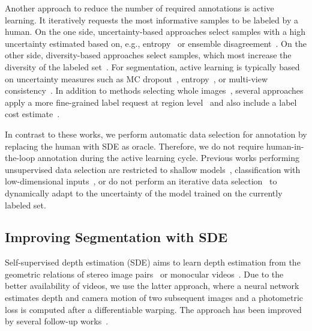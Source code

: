 \documentclass[final]{cvpr}
\begin{document}
Another approach to reduce the number of required annotations is active learning. It iteratively requests the most informative samples to be labeled by a human. 
On the one side, uncertainty-based approaches select samples with a high uncertainty estimated based on, e.g., entropy~\cite{hwa2004sample, settles2008analysis} or ensemble disagreement~\cite{seung1992query, mccallumzy1998employing}. 
On the other side, diversity-based approaches select samples, which most increase the diversity of the labeled set~\cite{nguyen2004active, sener2017active, sinha2019variational}.
For segmentation, active learning is typically based on uncertainty measures such as MC dropout~\cite{gal2016dropout, yang2017suggestive, mackowiak2018cereals},
entropy~\cite{kasarla2019region, xie2020deal}, or multi-view consistency~\cite{siddiqui2020viewal}. In addition to methods selecting whole images~\cite{gorriz2017cost, yang2017suggestive, xie2020deal}, several approaches apply a more fine-grained label request at region level~\cite{mackowiak2018cereals, kasarla2019region, siddiqui2020viewal} and also include a label cost estimate~\cite{mackowiak2018cereals, kasarla2019region}. 

In contrast to these works, we perform automatic data selection for annotation by replacing the human with SDE as oracle. Therefore, we do not require human-in-the-loop annotation during the active learning cycle. Previous works performing unsupervised data selection are restricted to shallow models~\cite{yu2006active, zhang2011active, nie2013early, hu2013active, shi2016diversifying, li2018joint}, classification with low-dimensional inputs~\cite{li2020deep}, or do not perform an iterative data selection~\cite{zheng2019biomedical} to dynamically adapt to the uncertainty of the model trained on the currently labeled set.

\subsection{Improving Segmentation with SDE}
\label{sec:segmentation_and_depth}

Self-supervised depth estimation (SDE) aims to learn depth estimation from the geometric relations of stereo image pairs~\cite{garg2016unsupervised,godard2017unsupervised} or monocular videos~\cite{zhou2017unsupervised}. Due to the better availability of videos, we use the latter approach, where a neural network estimates depth and camera motion of two subsequent images and a photometric loss is computed after a differentiable warping. The approach has been improved by several follow-up works~\cite{godard2019digging,chen2019self,zou2018df}.
\end{document}
